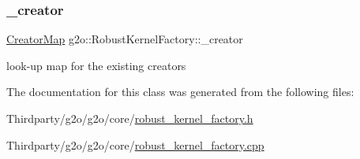 \subsubsection{\texorpdfstring{\+\_\+creator}{\_creator}}
{\footnotesize\ttfamily \mbox{\hyperlink{classg2o_1_1_robust_kernel_factory_aa143765542cbf4738e2137d61517b218}{Creator\+Map}} g2o\+::\+Robust\+Kernel\+Factory\+::\+\_\+creator\hspace{0.3cm}{\ttfamily [protected]}}



look-\/up map for the existing creators 



The documentation for this class was generated from the following files\+:\begin{DoxyCompactItemize}
\item 
Thirdparty/g2o/g2o/core/\mbox{\hyperlink{robust__kernel__factory_8h}{robust\+\_\+kernel\+\_\+factory.\+h}}\item 
Thirdparty/g2o/g2o/core/\mbox{\hyperlink{robust__kernel__factory_8cpp}{robust\+\_\+kernel\+\_\+factory.\+cpp}}\end{DoxyCompactItemize}

